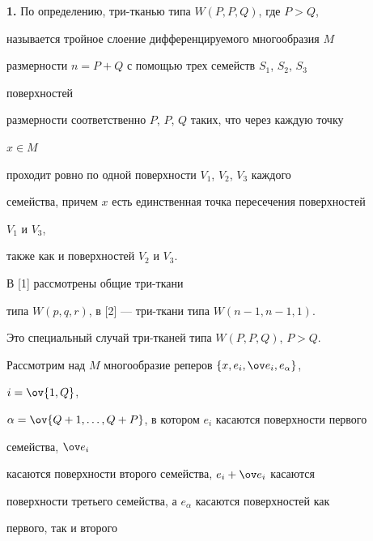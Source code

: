  


 




 


\maketitle 


\label{begin} 


 


{\bf 1.} По определению, три-тканью типа $W(P,P,Q)$, где $P>Q$, 


называется тройное слоение дифференцируемого многообразия $M$ 


размерности $n=P+Q$ с помощью трех семейств $S_1$, $S_2$, $S_3$ 


поверхностей 


размерности соответственно $P$, $P$, $Q$ таких, что через каждую точку 


$x\in M$ 


проходит ровно по одной поверхности $V_1$, $V_2$, $V_3$ каждого 


семейства, причем $x$ есть единственная точка пересечения поверхностей 


$V_1$ и $V_3$,


также как и поверхностей $V_2$ и $V_3$. 


 


В [1] рассмотрены общие три-ткани 


типа $W(p,q,r)$, в [2] --- три-ткани типа $W(n-1,n-1,1)$. 


Это специальный случай три-тканей типа $W(P,P,Q)$, $P>Q$. 


 


Рассмотрим над $M$ многообразие реперов $\{x,e_i,\ov e_i,e_\alpha\}$, 


$i=\ov{1,Q}$, 


$\alpha=\ov{Q+1,\dotsc,Q+P}$, в котором $e_i$ касаются поверхности первого 


семейства, $\ov e_i$ 


касаются поверхности второго семейства, $e_i+\ov e_i$ касаются 


поверхности третьего семейства, а $e_\alpha$ касаются поверхностей как 


первого, так и второго 


